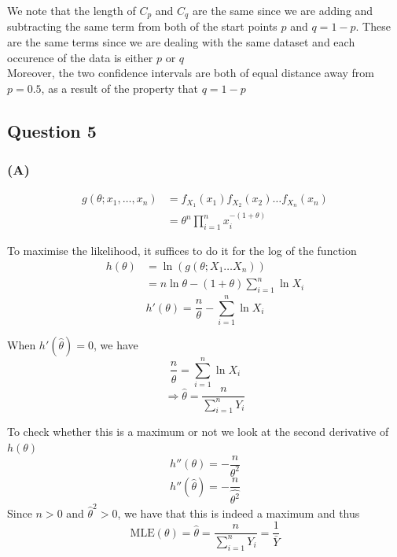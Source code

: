 \documentclass{article}
\begin{document}
We note that the length of \(C_p\) and \(C_ q\) are the same since
we are adding and subtracting the same term from both of the start points
\(p\) and \(q = 1-p\). These are the same terms since we are dealing with the same dataset and each occurence
of the data is either \(p\) or \(q\)
\\

Moreover, the two confidence intervals are both of equal distance away from
\(p = 0.5\), as a result of the property that \(q = 1-p\)

\subsection*{Question 5}
\subsubsection*{(A)}

\begin{align*}
	g(\theta ; x_1, \dots, x_n) & = f_{X_1}(x_1) f_{X_2}(x_2) \dots f_{X_n}(x_n) \\
	                            & = \theta^n \prod_{i=1}^{n} x_i^{-(1+ \theta)}
\end{align*}

To maximise the likelihood, it suffices to do it for the log of the function
\begin{align*}
	h(\theta) & = \ln(g(\theta; X_1 \dots X_n))                  \\
	          & = n\ln\theta - (1+\theta) \sum_{i=1}^{n} \ln X_i
\end{align*}
\[
	h'(\theta) = \frac{n}{\theta} - \sum_{i=1}^{n} \ln X_i
\]

When \(h'(\hat{\theta}) = 0\), we have
\[
	\frac{n}{\hat{\theta}} = \sum_{i=1}^{n} \ln X_i
\]
\[
	\Rightarrow \hat{\theta} = \frac{n}{\sum_{i=1}^{n} Y_i}
\]

To check whether this is a maximum or not we look at the second derivative of \(h(\theta)\)
\[
	h''(\theta) = -\frac{n}{\theta^2}
\]
\[
	h''(\hat{\theta}) = -\frac{n}{\hat{\theta^2}}
\]
Since \(n > 0\) and \(\hat{\theta}^2 > 0\), we have that this is indeed a maximum and thus
\[
	\text{MLE}(\theta) = \hat{\theta} = \frac{n}{\sum_{i=1}^{n} Y_i} = \frac{1}{\bar{Y}}
\]
\end{document}
